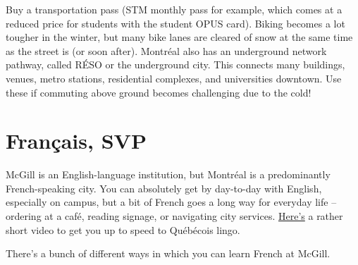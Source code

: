 Buy a transportation pass (STM monthly pass for example, which comes at a reduced price for students with the student OPUS card). Biking becomes a lot tougher in the winter, but many bike lanes are cleared of snow at the same time as the street is (or soon after). Montr\'eal also has an underground network pathway, called RÉSO or the underground city. This connects many buildings, venues, metro stations, residential complexes, and universities downtown. Use these if commuting above ground becomes challenging due to the cold!
    
\section{Français, SVP} \label{section:french}
McGill is an English-language institution, but Montr\'eal is a predominantly French-speaking city. You can absolutely get by day-to-day with English, especially on campus, but a bit of French goes a long way for everyday life -- ordering at a café, reading signage, or navigating city services. \href{https://www.youtube.com/watch?v=ZnCyqeSSWI8}{Here's} a rather short video to get you up to speed to Qu\'eb\'ecois lingo.

There's a bunch of different ways in which you can learn French at McGill.

